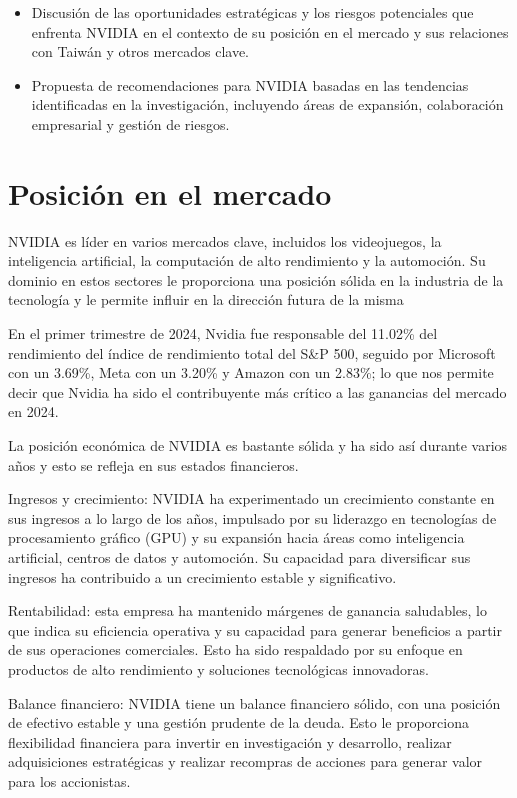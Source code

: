 \documentclass[conference]{IEEEtran}
\begin{document}
\begin{itemize}
	\item Discusión de las oportunidades estratégicas y los riesgos
	      potenciales que enfrenta NVIDIA en el contexto de su posición
	      en el mercado y sus relaciones con Taiwán y otros mercados clave.

	\item Propuesta de recomendaciones para NVIDIA basadas en
	      las tendencias identificadas en la investigación, incluyendo
	      áreas de expansión, colaboración empresarial y gestión de riesgos.
\end{itemize}

\section{Posición en el mercado}

NVIDIA es líder en varios mercados clave, incluidos los videojuegos,
la inteligencia artificial, la computación de alto rendimiento y
la automoción. Su dominio en estos sectores le proporciona una
posición sólida en la industria de la tecnología y le permite
influir en la dirección futura de la misma

En el primer trimestre de 2024, Nvidia fue responsable del
11.02\% del rendimiento del índice de rendimiento total
del S\&P 500, seguido por Microsoft con un 3.69\%, Meta
con un 3.20\% y Amazon con un 2.83\%; lo que nos permite
decir que Nvidia ha sido el contribuyente más crítico a las
ganancias del mercado en 2024.

La posición económica de NVIDIA es bastante sólida y ha sido
así durante varios años y esto se refleja en sus estados financieros.

Ingresos y crecimiento: NVIDIA ha experimentado un crecimiento
constante en sus ingresos a lo largo de los años, impulsado por
su liderazgo en tecnologías de procesamiento gráfico (GPU) y
su expansión hacia áreas como inteligencia artificial, centros
de datos y automoción. Su capacidad para diversificar sus ingresos
ha contribuido a un crecimiento estable y significativo.

Rentabilidad: esta empresa ha mantenido márgenes de ganancia
saludables, lo que indica su eficiencia operativa y su capacidad
para generar beneficios a partir de sus operaciones comerciales.
Esto ha sido respaldado por su enfoque en productos de alto
rendimiento y soluciones tecnológicas innovadoras.

Balance financiero: NVIDIA tiene un balance financiero sólido,
con una posición de efectivo estable y una gestión prudente de
la deuda. Esto le proporciona flexibilidad financiera para
invertir en investigación y desarrollo, realizar adquisiciones
estratégicas y realizar recompras de acciones para generar valor
para los accionistas.
\end{document}
